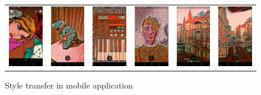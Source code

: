 \documentclass[../Main.tex]{subfiles}
\begin{document}
\begin{figure}[H]
\begin{tabular}{cccccc}
\includegraphics[width = 0.13\linewidth]{Images/app_photos/filters/under.jpg} &
\includegraphics[width = 0.13\linewidth]{Images/app_photos/dino/under.jpg} &
\includegraphics[width = 0.13\linewidth]{Images/app_photos/akai/under.jpg} &
\includegraphics[width = 0.13\linewidth]{Images/app_photos/me/under.jpg} &
\includegraphics[width = 0.13\linewidth]{Images/app_photos/kamienica/under.jpg} &
\includegraphics[width = 0.13\linewidth]{Images/app_photos/ulica/under.jpg} \\

\end{tabular}
\caption{Style transfer in mobile application}
\label{fig:app-results}
\end{figure}
\end{document}
